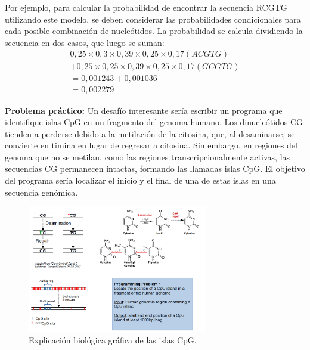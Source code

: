Por ejemplo, para calcular la probabilidad de encontrar la secuencia RCGTG utilizando este modelo, se deben considerar las probabilidades condicionales para cada posible combinación de nucleótidos. La probabilidad se calcula dividiendo la secuencia en dos casos, que luego se suman:
\begin{align*}
0,25 \times 0,3 \times 0,39 \times 0,25 \times 0,17 (ACGTG) \\
+ 0,25 \times 0,25 \times 0,39 \times 0,25 \times 0,17 (GCGTG) \\
= 0,001243 + 0,001036 \\
= 0,002279 
\end{align*}
 
\textbf{Problema práctico:}
Un desafío interesante sería escribir un programa que identifique islas CpG en un fragmento del genoma humano. Los dinucleótidos CG tienden a perderse debido a la metilación de la citosina, que, al desaminarse, se convierte en timina en lugar de regresar a citosina. Sin embargo, en regiones del genoma que no se metilan, como las regiones transcripcionalmente activas, las secuencias CG permanecen intactas, formando las llamadas islas CpG. El objetivo del programa sería localizar el inicio y el final de una de estas islas en una secuencia genómica.
\begin{figure}[htbp]
\centering
\includegraphics[width = 0.7\textwidth]{figs/cpg-islands.png}
\caption{Explicación biológica gráfica de las islas CpG. }
\end{figure}
 